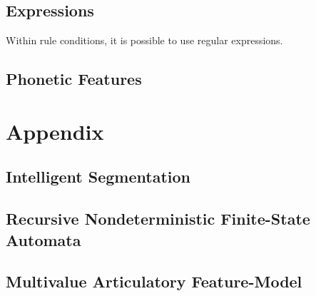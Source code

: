 \documentclass[10pt,letterpaper]{article}
\begin{document}
\subsection{Expressions}\label{sec:expressions}
Within rule conditions, it is possible to use regular expressions.

\subsection{Phonetic Features}\label{sec:features}

\section{Appendix}\label{sec:appendix}

\subsection{Intelligent Segmentation}\label{sec:segmentation}

\subsection{Recursive Nondeterministic Finite-State Automata}\label{sec:rndfa}

\subsection{Multivalue Articulatory Feature-Model}\label{sec:mafm}
\end{document}
